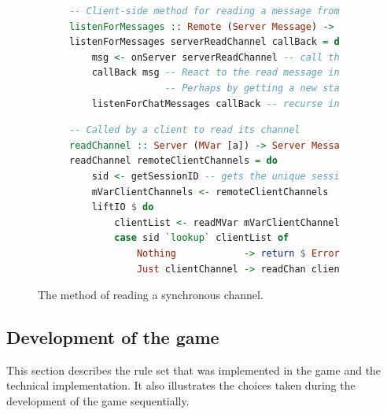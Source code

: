 \documentclass[a4paper]{article}
\begin{document}
\begin{figure}[ht!]

\begin{subfigure}[]{\textwidth}
\begin{lstlisting}[language=Haskell]
-- Client-side method for reading a message from the server
listenForMessages :: Remote (Server Message) -> (Message -> Client ()) -> Client ()
listenForMessages serverReadChannel callBack = do
    msg <- onServer serverReadChannel -- call the server with the readChannel function
    callBack msg -- React to the read message in some way
                 -- Perhaps by getting a new state
    listenForChatMessages callBack -- recurse indefinitely
\end{lstlisting}
\end{subfigure}

\begin{subfigure}[]{\textwidth}
\begin{lstlisting}[language=Haskell]
-- Called by a client to read its channel
readChannel :: Server (MVar [a]) -> Server Message
readChannel remoteClientChannels = do
    sid <- getSessionID -- gets the unique session id
    mVarClientChannels <- remoteClientChannels
    liftIO $ do
        clientList <- readMVar mVarClientChannels
        case sid `lookup` clientList of
            Nothing            -> return $ ErrorMessage "Couldn't find client."
            Just clientChannel -> readChan clientChannel -- readChan is blocking
\end{lstlisting}
\end{subfigure}

\caption{The method of reading a synchronous channel.}
\label{fig:reading-channel}
\end{figure}


\subsection{Development of the game}
\label{sec:game-development}
This section describes the rule set that was implemented in the game and the technical implementation. It also illustrates the choices taken during the development of the game sequentially.
\end{document}
